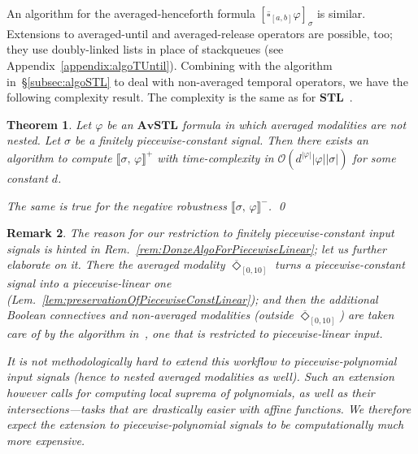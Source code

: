 \documentclass[envcountsect,orivec]{llncs} \usepackage{etex} \usepackage[]{graphicx}
\newtheorem{mytheorem}{Theorem}[section]
\newtheorem{myremark}[mytheorem]{Remark}
\def\myqed{\qed}
\newcommand{\STL}{\textbf{STL}}
\newcommand{\TDiaOp}[1]{\overline{\Diamond}_{#1}}
\newcommand{\TBoxOp}[1]{\overline{\square}_{#1}}
\newcommand{\Robust}[2]{{ \llbracket #1,\, #2 \rrbracket}}
\newcommand{\AvSTL}{\textbf{AvSTL}}
\begin{document}
An algorithm for the averaged-henceforth formula
$[\TBoxOp{[a,b]} \varphi]_{\sigma}$ is similar. Extensions to
averaged-until and averaged-release operators are possible, too; they
use doubly-linked lists in place of stackqueues (see Appendix~\ref{appendix:algoTUntil}).
Combining with the algorithm in~\S{}\ref{subsec:algoSTL} to deal with
non-averaged temporal operators, we have the following 
complexity result. The complexity is the same as for $\STL$~\cite{DBLP:conf/cav/DonzeFM13}.







\begin{mytheorem}\label{thm:complexity_rel}
  Let $\varphi$ be an $\AvSTL$ formula 
  in which averaged modalities are not nested.
  Let $\sigma$ be a finitely piecewise-constant signal.
Then there exists an algorithm
  to compute
  $\Robust{\sigma}{\varphi}^{+}$
  with time-complexity in 
  $\mathcal{O}(d^{|\varphi|}  |\varphi| |\sigma|)$
  for some constant $d$.

  The same is true for the negative robustness
  $\Robust{\sigma}{\varphi}^{-}$.
  \myqed
\end{mytheorem}


\begin{myremark}
 The reason for our restriction to finitely piecewise-constant input
 signals is hinted in Rem.~\ref{rem:DonzeAlgoForPiecewiseLinear}; let us
 further elaborate on it.
 There the averaged modality $\TDiaOp{[0,10]}$ turns a piecewise-constant signal into a
 piecewise-linear one
 (Lem.~\ref{lem:preservationOfPiecewiseConstLinear}); and then the
 additional Boolean connectives and non-averaged
 modalities (outside  $\TDiaOp{[0,10]}$) are taken care of by the algorithm
 in~\cite{DBLP:conf/cav/DonzeFM13}, one that is restricted
 to piecewise-linear input.

 It is not methodologically hard to extend this workflow to
 piecewise-\emph{polynomial} input signals (hence to nested averaged
 modalities as well). Such an extension however calls
 for computing local suprema of polynomials, as well as their
 intersections---tasks that are drastically easier with affine
 functions. We therefore expect  the extension to
 piecewise-polynomial signals to be computationally
 much more expensive.
\end{myremark}
\end{document}
